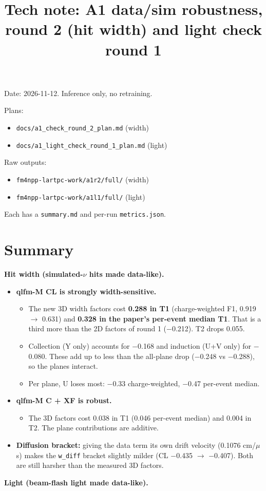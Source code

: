 \documentclass[10pt,a4paper]{article}
\title{\textbf{Tech note: A1 data/sim robustness, round 2 (hit width) and light check round 1}}
\author{}
\date{}
\begin{document}
\maketitle
\vspace{-3em}
Date: 2026-11-12. Inference only, no retraining.

Plans:

\begin{itemize}
\item \texttt{docs/\allowbreak{}a1\_\allowbreak{}check\_\allowbreak{}round\_\allowbreak{}2\_\allowbreak{}plan.md} (width)
\item \texttt{docs/\allowbreak{}a1\_\allowbreak{}light\_\allowbreak{}check\_\allowbreak{}round\_\allowbreak{}1\_\allowbreak{}plan.md} (light)
\end{itemize}
Raw outputs:

\begin{itemize}
\item \texttt{fm4npp-lartpc-work/\allowbreak{}a1r2/\allowbreak{}full/\allowbreak{}} (width)
\item \texttt{fm4npp-lartpc-work/\allowbreak{}a1l1/\allowbreak{}full/\allowbreak{}} (light)
\end{itemize}
Each has a \texttt{summary.md} and per-run \texttt{metrics.json}.

\section*{Summary}
\textbf{Hit width (simulated-$\nu$ hits made data-like).}

\begin{itemize}
\item \textbf{qlfm-M CL is strongly width-sensitive.}
\begin{itemize}
\item The new 3D width factors cost \textbf{0.288 in T1} (charge-weighted F1, 0.919 $\rightarrow$ 0.631) and \textbf{0.328 in the paper's per-event median T1}. That is a third more than the 2D factors of round 1 ($-$0.212). T2 drops 0.055.
\item Collection (Y only) accounts for $-$0.168 and induction (U+V only) for $-$0.080. These add up to less than the all-plane drop ($-$0.248 vs $-$0.288), so the planes interact.
\item Per plane, U loses most: $-$0.33 charge-weighted, $-$0.47 per-event median.
\end{itemize}
\item \textbf{qlfm-M C + XF is robust.}
\begin{itemize}
\item The 3D factors cost 0.038 in T1 (0.046 per-event median) and 0.004 in T2. The plane contributions are additive.
\end{itemize}
\item \textbf{Diffusion bracket:} giving the data term its own drift velocity (0.1076 cm/$\mu$s) makes the \texttt{w\_\allowbreak{}diff} bracket slightly milder (CL $-$0.435 $\rightarrow$ $-$0.407). Both are still harsher than the measured 3D factors.
\end{itemize}
\textbf{Light (beam-flash light made data-like).}
\end{document}
